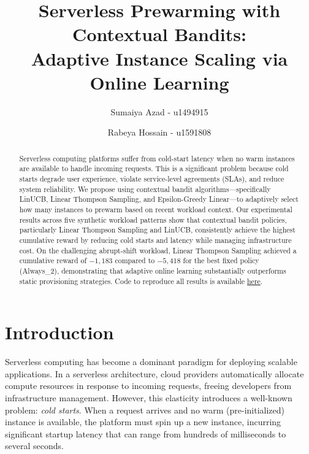 \documentclass[11pt]{article}
\title{\textbf{Serverless Prewarming with Contextual Bandits: \\ Adaptive Instance Scaling via Online Learning}}
\author{
    Sumaiya Azad - u1494915 \and Rabeya Hossain - u1591808
}
\date{}
\begin{document}
\maketitle

\begin{abstract}
Serverless computing platforms suffer from cold-start latency when no warm instances are available to handle incoming requests. This is a significant problem because cold starts degrade user experience, violate service-level agreements (SLAs), and reduce system reliability. We propose using contextual bandit algorithms---specifically LinUCB, Linear Thompson Sampling, and Epsilon-Greedy Linear---to adaptively select how many instances to prewarm based on recent workload context. Our experimental results across five synthetic workload patterns show that contextual bandit policies, particularly Linear Thompson Sampling and LinUCB, consistently achieve the highest cumulative reward by reducing cold starts and latency while managing infrastructure cost. On the challenging abrupt-shift workload, Linear Thompson Sampling achieved a cumulative reward of $-1{,}183$ compared to $-5{,}418$ for the best fixed policy (Always\_2), demonstrating that adaptive online learning substantially outperforms static provisioning strategies. Code to reproduce all results is available \href{https://github.com/sumaiyaazad/contextual_bandits_for_per-function_autoscaling_in_serverless}{here}.
\end{abstract}

\section{Introduction}

Serverless computing has become a dominant paradigm for deploying scalable applications. In a serverless architecture, cloud providers automatically allocate compute resources in response to incoming requests, freeing developers from infrastructure management. However, this elasticity introduces a well-known problem: \textit{cold starts}. When a request arrives and no warm (pre-initialized) instance is available, the platform must spin up a new instance, incurring significant startup latency that can range from hundreds of milliseconds to several seconds.
\end{document}
